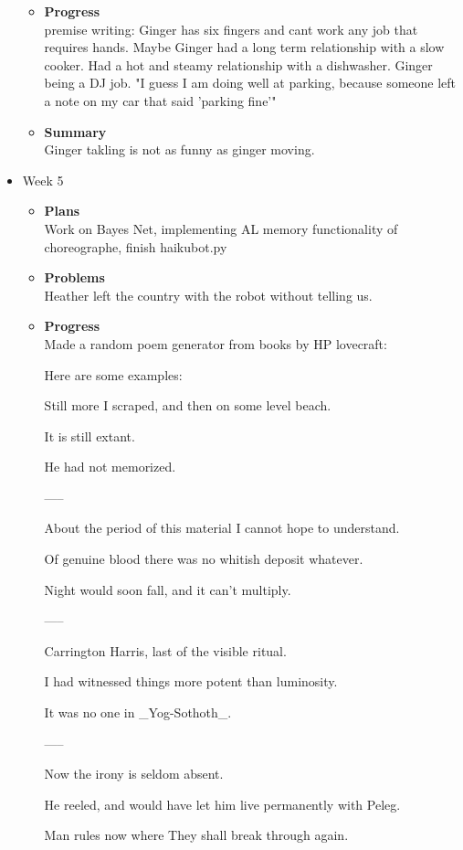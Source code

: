 \begin{itemize}
\begin{itemize}
				\item \textbf{Progress} \\
				premise writing: Ginger has six fingers and cant work any job that requires hands. Maybe Ginger had a long term relationship with a slow cooker. Had a hot and steamy relationship with a dishwasher. Ginger being a DJ job. "I guess I am doing well at parking, because someone left a note on my car that said 'parking fine'"
				\item \textbf{Summary} \\
				Ginger takling is not as funny as ginger moving.
			\end{itemize}
		\item{Week 5}
			\begin{itemize}
				\item \textbf{Plans} \\
				Work on Bayes Net, implementing AL memory functionality of choreographe, finish haikubot.py
				\item \textbf{Problems} \\
				Heather left the country with the robot without telling us.
				\item \textbf{Progress} \\
					Made a random poem generator from books by HP lovecraft:

					Here are some examples:

		Still more I scraped, and then on some level beach. 

		It is still extant. 

		He had not memorized. 


		-----

		About the period of this material I cannot hope to understand. 

		Of genuine blood there was no whitish deposit whatever. 

		Night would soon fall, and it can't multiply. 

		-----

		Carrington Harris, last of the visible ritual. 

		I had witnessed things more potent than luminosity. 

		It was no one in _Yog-Sothoth_. 

		-----

		Now the irony is seldom absent. 

		He reeled, and would have let him live permanently with Peleg. 

		Man rules now where They shall break through again. 


\end{itemize}
\end{itemize}

